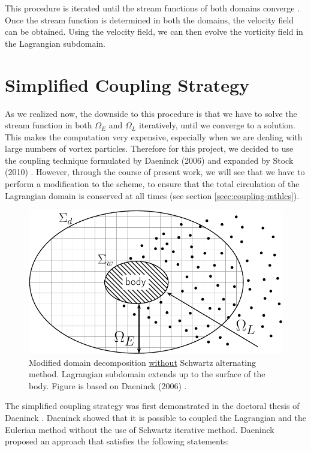 	This procedure is iterated until the stream functions of both domains converge \cite{Ould-Salihi2001a}. Once the stream function is determined in both the domains, the velocity field can be obtained. Using the velocity field, we can then evolve the vorticity field in the Lagrangian subdomain.

	\section{Simplified Coupling Strategy}
	\label{sec:helvpm-scs}
	
	As we realized now, the downside to this procedure is that we have to solve the stream function in both $\Omega_E$ and $\Omega_L$ iteratively, until we converge to a solution. This makes the computation very expensive, especially when we are dealing with large numbers of vortex particles. Therefore for this project, we decided to use the coupling technique formulated by Daeninck (2006) \cite{Daeninck2006} and expanded by Stock (2010) \cite{Stock2010a}. However, through the course of present work, we will see that we have to perform a modification to the scheme, to ensure that the total circulation of the Lagrangian domain is conserved at all times (see section \ref{seec:coupling-mthlcs}).	
	

		\begin{figure}[!h]
			\centering
			\includegraphics[width=0.6\linewidth]{figures/hybrid/domainDecomposition_daenick_type2-crop.pdf}
			\caption{Modified domain decomposition \underline{without} Schwartz alternating method. Lagrangian subdomain extends up to the surface of the body. Figure is based on Daeninck (2006) \cite{Daeninck2006}.}
			\label{fig:domainDecomposition_daenick}
		\end{figure}
	
	The simplified coupling strategy was first demonstrated in the doctoral thesis of Daeninck \cite{Daeninck2006}. Daeninck showed that it is possible to coupled the Lagrangian and the Eulerian method without the use of Schwartz iterative method. Daeninck proposed an approach that satisfies the following statements:
	
